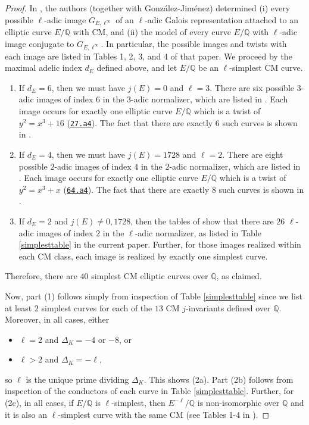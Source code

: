 \documentclass[11pt]{amsart}
\theoremstyle{definition}
\newcommand{\Q}{\mathbb{Q}}
\begin{document}
\begin{proof}
    In \cite{modelspaper}, the authors (together with Gonz\'alez-Jim\'enez) determined (i) every possible $\ell$-adic image $G_{E,\ell^\infty}$ of an $\ell$-adic Galois representation attached to an elliptic curve $E/\Q$ with CM, and (ii) the model of every curve $E/\Q$ with $\ell$-adic image conjugate to $G_{E,\ell^\infty}$. In particular, the possible images and twists with each image are listed in Tables 1, 2, 3, and 4 of that paper. We proceed by the maximal adelic index $d_E$ defined above, and let $E/\Q$ be an $\ell$-simplest CM curve.
    \begin{enumerate}
         \item[(i)] If $d_E=6$, then we must have $j(E)=0$ and $\ell=3$. There are six possible $3$-adic images of index $6$ in the $3$-adic normalizer, which are listed in \cite[Table 3]{modelspaper}. Each image occurs for exactly one elliptic curve $E/\Q$ which is a twist of $y^2 = x^3 + 16$ (\href{https://www.lmfdb.org/EllipticCurve/Q/27/a/4}{\texttt{27.a4}}). The fact that there are exactly $6$ such curves is shown in \cite[Theorem 3.17]{modelspaper}.
         
        \item[(ii)] If $d_E=4$, then we must have $j(E)=1728$ and $\ell=2$. There are eight possible $2$-adic images of index $4$ in the $2$-adic normalizer, which are listed in \cite[Table 2]{modelspaper}. Each image occurs for exactly one elliptic curve $E/\Q$ which is a twist of $y^2=x^3+x$ (\href{https://www.lmfdb.org/EllipticCurve/Q/64/a/4}{\texttt{64.a4}}). The fact that there are exactly $8$ such curves is shown in \cite[Theorem 3.5]{modelspaper}.
        \item[(iii)] If $d_E=2$ and $j(E)\neq 0,1728$, then the tables of \cite{modelspaper} show that there are $26$ $\ell$-adic images of index $2$ in the $\ell$-adic normalizer, as listed in Table \ref{simplesttable} in the current paper. Further, for those images realized within each CM class, each image is realized by exactly one simplest curve.
    \end{enumerate}
    Therefore, there are $40$ simplest CM elliptic curves over $\Q$, as claimed.

  Now, part (1) follows simply from inspection of Table \ref{simplesttable} since we list at least $2$ simplest curves for each of the $13$ CM $j$-invariants defined over $\Q$. Moreover, in all cases, either 
    \begin{itemize}
        \item 
    $\ell=2$ and $\Delta_K = -4$ or $-8$, or 
    \item $\ell>2$ and $\Delta_K=-\ell$,
    \end{itemize}
    so $\ell$ is the unique prime dividing $\Delta_K$. This shows (2a). Part (2b) follows from inspection of the conductors of each curve in Table \ref{simplesttable}. Further, for (2c), in all cases, if $E/\Q$ is $\ell$-simplest, then $E^{-\ell}/\Q$ is non-isomorphic over $\Q$ and it is also an $\ell$-simplest curve with the same CM (see Tables 1-4 in \cite{modelspaper}). 


\end{proof}
\end{document}

